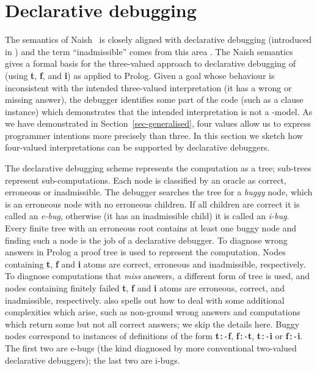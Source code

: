 \documentclass{tlp}
\begin{document}
\section{Declarative debugging}
\label{sec-debugging}

The semantics of Naish~\citeyear{sem3neg} is closely aligned with
declarative debugging (introduced in ) and the term
``inadmissible'' comes from this area \cite{Per86}.  The Naish semantics
gives a formal basis for the three-valued approach to declarative
debugging of  (using \textbf{t}, \textbf{f}, and
\textbf{i}) as applied to Prolog.  Given a goal whose behaviour
is inconsistent with the intended three-valued interpretation (it
has a wrong or missing answer), the debugger identifies some part
of the code (such as a clause instance) which demonstrates that the
intended interpretation is not a -model.  As we have
demonstrated in Section~\ref{sec-generalised}, four values allow us
to express programmer intentions more precisely than three.  In this
section we sketch how four-valued interpretations can be supported by
declarative debuggers.

The declarative debugging scheme represents the computation as a tree;
sub-trees represent sub-computations.  
Each node is classified by an oracle as correct, erroneous
or inadmissible.  The debugger searches the tree for a \emph{buggy}
node, which is an erroneous node with no erroneous children.
If all children are correct it is called an \emph{e-bug}, otherwise
(it has an inadmissible child) it is called an \emph{i-bug}.
Every finite tree
with an erroneous root contains at least one buggy node and finding such
a node is the job of a declarative debugger.
To diagnose wrong answers in Prolog a proof tree \cite{Llo84} is used to
represent the computation.  Nodes containing \textbf{t}, \textbf{f} and
\textbf{i} atoms are correct, erroneous and inadmissible, respectively.
To diagnose computations that \emph{miss} answers, a different form
of tree is used, and nodes containing finitely failed \textbf{t},
\textbf{f} and \textbf{i} atoms are erroneous, correct, and inadmissible,
respectively.   also spells out how to deal with some
additional complexities which arise, such as non-ground wrong answers
and computations which return some but not all correct answers; we skip
the details here.  Buggy nodes correspond to instances of definitions of
the form
\textbf{t}\texttt{:-}\textbf{f},
\textbf{f}\texttt{:-}\textbf{t},
\textbf{t}\texttt{:-}\textbf{i} or
\textbf{f}\texttt{:-}\textbf{i}.
The first two are e-bugs (the kind diagnosed by more conventional
two-valued declarative debuggers); the last two are i-bugs.
\end{document}
